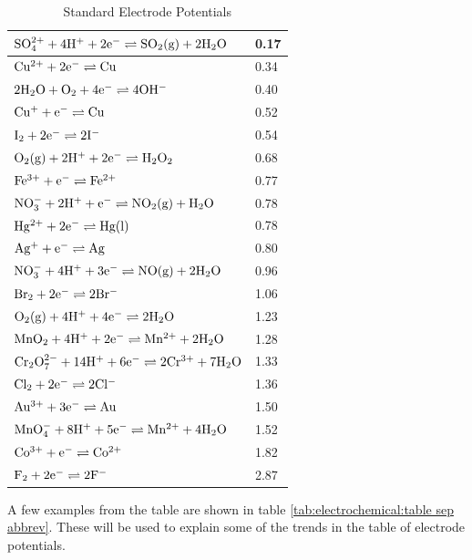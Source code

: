 \begin{table}
\begin{center}
\begin{tabular}{|l|l|}
$\rm{SO_{4}^{2+} + 4H^{+} + 2e^{-} \rightleftharpoons SO_{2} (g) + 2H_{2}O }$& 0.17 \\ \hline
$\rm{Cu^{2+} + 2e^{-} \rightleftharpoons Cu }$& 0.34 \\ \hline
$\rm{2H_{2}O + O_{2} + 4e^{-} \rightleftharpoons 4OH^{-} }$& 0.40 \\ \hline
$\rm{Cu^{+} + e^{-} \rightleftharpoons Cu }$& 0.52 \\ \hline
$\rm{I_{2} + 2e^{-} \rightleftharpoons 2I^{-} }$& 0.54 \\ \hline
$\rm{O_{2} (g) + 2H^{+} + 2e^{-} \rightleftharpoons H_{2}O_{2} }$& 0.68 \\ \hline
$\rm{Fe^{3+} + e^{-} \rightleftharpoons Fe^{2+}  }$& 0.77 \\ \hline
$\rm{NO_{3}^{-} + 2H^{+} + e^{-} \rightleftharpoons NO_{2} (g) + H_{2}O }$& 0.78 \\ \hline
$\rm{Hg^{2+} + 2e^{-} \rightleftharpoons Hg (l) }$& 0.78 \\ \hline
$\rm{Ag^{+} + e^{-} \rightleftharpoons Ag }$& 0.80 \\ \hline
$\rm{NO_{3}^{-} + 4H^{+} +3 e^{-} \rightleftharpoons NO (g) + 2H_{2}O }$& 0.96 \\ \hline
$\rm{Br_{2} + 2e^{-} \rightleftharpoons 2Br^{-} }$& 1.06 \\ \hline
$\rm{O_{2} (g) + 4H^{+} + 4e^{-} \rightleftharpoons 2H_{2}O }$& 1.23 \\ \hline
$\rm{MnO_{2} + 4H^{+} + 2e^{-} \rightleftharpoons Mn^{2+} + 2H_{2}O }$& 1.28 \\ \hline
$\rm{Cr_{2}O_{7}^{2-} + 14H^{+} + 6e^{-} \rightleftharpoons 2Cr^{3+} + 7H_{2}O }$& 1.33 \\ \hline
$\rm{Cl_{2} + 2e^{-} \rightleftharpoons 2Cl^{-} }$& 1.36 \\ \hline
$\rm{Au^{3+} + 3e^{-} \rightleftharpoons Au }$& 1.50 \\ \hline
$\rm{MnO_{4}^{-} + 8H^{+} + 5e^{-} \rightleftharpoons Mn^{2+} + 4H_{2}O }$& 1.52 \\ \hline
$\rm{Co^{3+} + e^{-} \rightleftharpoons Co^{2+} }$& 1.82 \\ \hline
$\rm{F_{2} + 2e^{-} \rightleftharpoons 2F^{-} }$& 2.87 \\ \hline
\end{tabular}
\end{center}
\caption{Standard Electrode Potentials} 
\label{tab:electrochemical:table sep}
\end{table}

A few examples from the table are shown in table \ref{tab:electrochemical:table sep abbrev}. These will be used to explain some of the trends in the table of electrode potentials.

